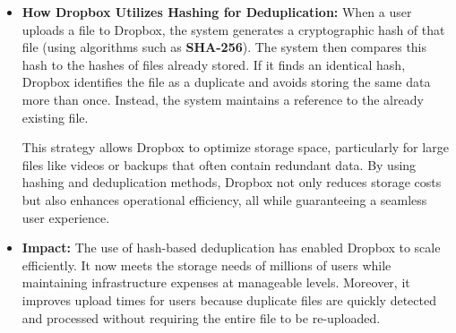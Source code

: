 \documentclass[11pt,a4paper]{article}
\begin{document}
        \begin{itemize}
            \item \textbf{How Dropbox Utilizes Hashing for Deduplication:}
            \newline
            When a user uploads a file to Dropbox, the system generates a cryptographic hash of that file (using algorithms such as \textbf{SHA-256}). The system then compares this hash to the hashes of files already stored. If it finds an identical hash, Dropbox identifies the file as a duplicate and avoids storing the same data more than once. Instead, the system maintains a reference to the already existing file.
            \par
            This strategy allows Dropbox to optimize storage space, particularly for large files like videos or backups that often contain redundant data. By using hashing and deduplication methods, Dropbox not only reduces storage costs but also enhances operational efficiency, all while guaranteeing a seamless user experience.

            \item \textbf{Impact:}
            \newline
            The use of hash-based deduplication has enabled Dropbox to scale efficiently. It now meets the storage needs of millions of users while maintaining infrastructure expenses at manageable levels. Moreover, it improves upload times for users because duplicate files are quickly detected and processed without requiring the entire file to be re-uploaded.

        \end{itemize}
\end{document}
